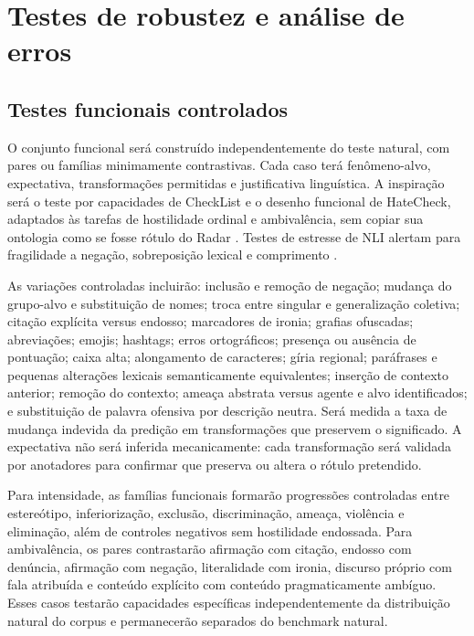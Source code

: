 \section{Testes de robustez e análise de erros}

\subsection{Testes funcionais controlados}

O conjunto funcional será construído independentemente do teste natural, com pares ou famílias minimamente contrastivas. Cada caso terá fenômeno-alvo, expectativa, transformações permitidas e justificativa linguística. A inspiração será o teste por capacidades de CheckList e o desenho funcional de HateCheck, adaptados às tarefas de hostilidade ordinal e ambivalência, sem copiar sua ontologia como se fosse rótulo do Radar \cite{ribeiro2020,rottger2021}. Testes de estresse de NLI alertam para fragilidade a negação, sobreposição lexical e comprimento \cite{naik2018}.

As variações controladas incluirão: inclusão e remoção de negação; mudança do grupo-alvo e substituição de nomes; troca entre singular e generalização coletiva; citação explícita versus endosso; marcadores de ironia; grafias ofuscadas; abreviações; emojis; hashtags; erros ortográficos; presença ou ausência de pontuação; caixa alta; alongamento de caracteres; gíria regional; paráfrases e pequenas alterações lexicais semanticamente equivalentes; inserção de contexto anterior; remoção do contexto; ameaça abstrata versus agente e alvo identificados; e substituição de palavra ofensiva por descrição neutra. Será medida a taxa de mudança indevida da predição em transformações que preservem o significado. A expectativa não será inferida mecanicamente: cada transformação será validada por anotadores para confirmar que preserva ou altera o rótulo pretendido.

Para intensidade, as famílias funcionais formarão progressões controladas entre estereótipo, inferiorização, exclusão, discriminação, ameaça, violência e eliminação, além de controles negativos sem hostilidade endossada. Para ambivalência, os pares contrastarão afirmação com citação, endosso com denúncia, afirmação com negação, literalidade com ironia, discurso próprio com fala atribuída e conteúdo explícito com conteúdo pragmaticamente ambíguo. Esses casos testarão capacidades específicas independentemente da distribuição natural do corpus e permanecerão separados do benchmark natural.

